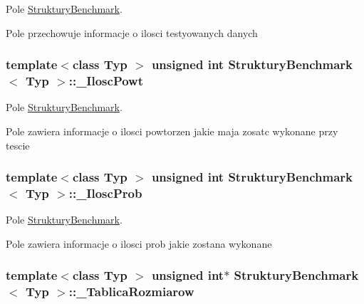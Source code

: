 Pole \hyperlink{class_struktury_benchmark}{Struktury\-Benchmark}. 

Pole przechowuje informacje o ilosci testyowanych danych \hypertarget{class_struktury_benchmark_a49d86123ea73ecc57bc161dcf40fba01}{
\subsubsection[{\-\_\-\-Ilosc\-Powt}]{\setlength{\rightskip}{0pt plus 5cm}template$<$class Typ $>$ unsigned int {\bf Struktury\-Benchmark}$<$ Typ $>$\-::\-\_\-\-Ilosc\-Powt\hspace{0.3cm}{\ttfamily [private]}}}\label{class_struktury_benchmark_a49d86123ea73ecc57bc161dcf40fba01}


Pole \hyperlink{class_struktury_benchmark}{Struktury\-Benchmark}. 

Pole zawiera informacje o ilosci powtorzen jakie maja zosatc wykonane przy tescie \hypertarget{class_struktury_benchmark_a5b2aee5eb235c0ad6c56a4871aad6bd3}{
\subsubsection[{\-\_\-\-Ilosc\-Prob}]{\setlength{\rightskip}{0pt plus 5cm}template$<$class Typ $>$ unsigned int {\bf Struktury\-Benchmark}$<$ Typ $>$\-::\-\_\-\-Ilosc\-Prob\hspace{0.3cm}{\ttfamily [private]}}}\label{class_struktury_benchmark_a5b2aee5eb235c0ad6c56a4871aad6bd3}


Pole \hyperlink{class_struktury_benchmark}{Struktury\-Benchmark}. 

Pole zawiera informacje o ilosci prob jakie zostana wykonane \hypertarget{class_struktury_benchmark_a9077a191d28f29d9b2eba8d4e8f72ce8}{
\subsubsection[{\-\_\-\-Tablica\-Rozmiarow}]{\setlength{\rightskip}{0pt plus 5cm}template$<$class Typ $>$ unsigned int$\ast$ {\bf Struktury\-Benchmark}$<$ Typ $>$\-::\-\_\-\-Tablica\-Rozmiarow\hspace{0.3cm}{\ttfamily [private]}}}\label{class_struktury_benchmark_a9077a191d28f29d9b2eba8d4e8f72ce8}


